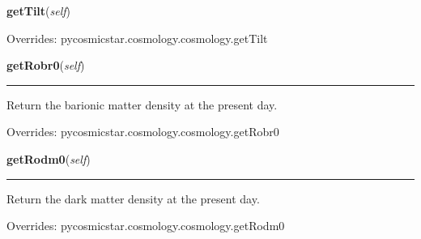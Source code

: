     \vspace{0.5ex}

\hspace{.8\funcindent}\begin{boxedminipage}{\funcwidth}

    \raggedright \textbf{getTilt}(\textit{self})

\setlength{\parskip}{2ex}
\setlength{\parskip}{1ex}
      Overrides: pycosmicstar.cosmology.cosmology.getTilt

    \end{boxedminipage}

    \vspace{0.5ex}

\hspace{.8\funcindent}\begin{boxedminipage}{\funcwidth}

    \raggedright \textbf{getRobr0}(\textit{self})

    \vspace{-1.5ex}

    \rule{\textwidth}{0.5\fboxrule}
\setlength{\parskip}{2ex}
    Return the barionic matter density at the present day.

\setlength{\parskip}{1ex}
      Overrides: pycosmicstar.cosmology.cosmology.getRobr0

    \end{boxedminipage}

    \vspace{0.5ex}

\hspace{.8\funcindent}\begin{boxedminipage}{\funcwidth}

    \raggedright \textbf{getRodm0}(\textit{self})

    \vspace{-1.5ex}

    \rule{\textwidth}{0.5\fboxrule}
\setlength{\parskip}{2ex}
    Return the dark matter density at the present day.

\setlength{\parskip}{1ex}
      Overrides: pycosmicstar.cosmology.cosmology.getRodm0

    \end{boxedminipage}

